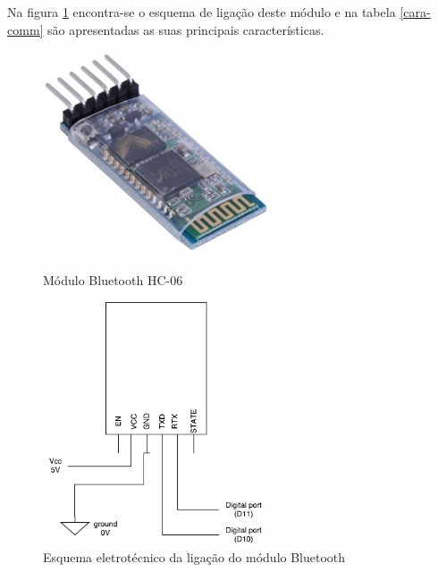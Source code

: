 Na figura \ref{comimageesquema} encontra-se o esquema de ligação deste módulo e na tabela \ref{cara-comm} são apresentadas as suas principais características.

\newpage

\begin{figure}[h]
	\centering
	\begin{minipage}[b]{0.49\textwidth}
		\centering
		\includegraphics[width=0.6\textwidth]{img/hardware/bluetooth_zs-040.png}
		\caption{Módulo Bluetooth HC-06}
		\label{comimage}
	\end{minipage}
	\hfill
	\begin{minipage}[b]{0.49\textwidth}
		\centering
		\includegraphics[width=0.6\textwidth]{img/comm-blue/electronic-sensors.pdf}
		\caption{Esquema eletrotécnico da ligação do módulo Bluetooth}
		\label{comimageesquema}
	\end{minipage}
\end{figure}



